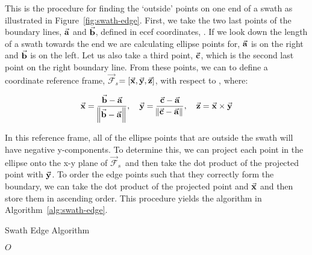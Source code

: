 
\newcommand{\Fs}{$\vec{\mathcal{F}}_s$} 

This is the procedure for finding the `outside' points on one end of a swath as
illustrated in Figure~\ref{fig:swath-edge}. First, we take the two last points
of the boundary lines, $\vec{\bm{\mathrm{a}}}$ and $\vec{\bm{\mathrm{b}}}$, defined in \gls{ecef}
coordinates, \Fe. If we look down the length of a swath towards the end we are
calculating ellipse points for, $\vec{\bm{\mathrm{a}}}$ is on the right and $\vec{\bm{\mathrm{b}}}$ is on
the left.  Let us also take a third point, $\vec{\bm{\mathrm{c}}}$, which is the second last
point on the right boundary line.  From these points, we can to define a
coordinate reference frame, \Fs $= [\vec{\bm{\mathrm{x}}}, \vec{\bm{\mathrm{y}}}, \vec{\bm{\mathrm{z}}}]$, with respect
to \Fe, where:

\begin{equation}
    \vec{\bm{\mathrm{x}}} = \frac{\vec{\bm{\mathrm{b}}}-\vec{\bm{\mathrm{a}}}}{\norm{\vec{\bm{\mathrm{b}}} - \vec{\bm{\mathrm{a}}}}}
    , \quad
    \vec{\bm{\mathrm{y}}} = \frac{\vec{\bm{\mathrm{c}}}-\vec{\bm{\mathrm{a}}}}{\norm{\vec{\bm{\mathrm{c}}} - \vec{\bm{\mathrm{a}}}}}
    , \quad
    \vec{\bm{\mathrm{z}}} = \vec{\bm{\mathrm{x}}} \times \vec{\bm{\mathrm{y}}}
\end{equation}

In this reference frame, all of the ellipse points that are outside the swath
will have negative y-components. To determine this, we can project each point
in the ellipse onto the x-y plane of \Fs~and then take the dot product of the
projected point with $\vec{\bm{\mathrm{y}}}$. To order the edge points such that they
correctly form the boundary, we can take the dot product of the projected point
and $\vec{\bm{\mathrm{x}}}$ and then store them in ascending order. This procedure yields
the algorithm in Algorithm~\ref{alg:swath-edge}.


\begin{algorithm}
    \caption{Swath Edge Algorithm} 
    \label{alg:swath-edge}
    \begin{algorithmic}[1] 
		
		
		


	    \EndIf
	\EndFor
	\State \Return $O$
	\EndFunction
    \end{algorithmic} 
\end{algorithm}

